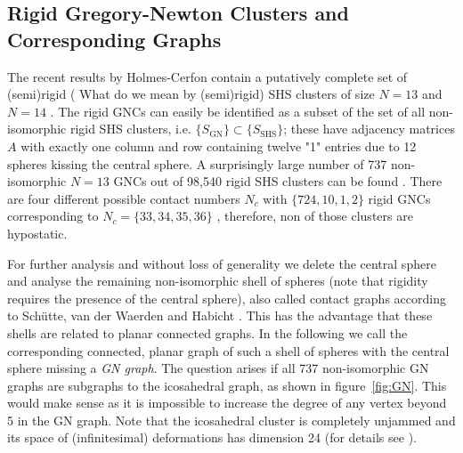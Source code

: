 \subsection{Rigid Gregory-Newton Clusters and Corresponding Graphs}

The recent results by Holmes-Cerfon contain a putatively complete set of
(semi)rigid {(\color{red} What do we mean by (semi)rigid)} SHS clusters of size $N=13$ and $N=14$
\autocite{Holmes-Cerfon_EnumeratingRigidSphere_2016}. The rigid GNCs can easily be
identified as a subset of the set of all non-isomorphic rigid SHS clusters,
i.e. $\{ S_\mathrm{GN}\}\subset \{ S_\mathrm{SHS}\}$; these have adjacency matrices
$A$ with exactly one column and row containing twelve "1" entries due to 12
spheres kissing the central sphere. A surprisingly large number of 737
non-isomorphic $N = 13$ GNCs out of 98,540 rigid SHS clusters can be found
\autocite{Trombach_stickyhardsphereLennardJonestypeclusters_2018}. There are four different possible contact numbers $N_c$
with $\{724,10,1,2\}$ rigid GNCs corresponding to $N_c=\{33,34,35,36\}$
\autocite{Robinson_Arrangement24points_1961}, therefore, non of those clusters are hypostatic.

For further analysis and without loss of generality we delete the central
sphere and analyse the remaining non-isomorphic shell of spheres (note that
rigidity requires the presence of the central sphere), also called contact
graphs according to Sch{\"u}tte, van der Waerden and Habicht
\autocite{Schuette_AufwelcherKugel_1951}. This has the advantage that these shells are related to
planar connected graphs. In the following we call the corresponding connected,
planar graph of such a shell of spheres with the central sphere missing a
\textit{GN graph}. The question arises if all 737 non-isomorphic GN graphs are
subgraphs to the icosahedral graph, as shown in figure~\ref{fig:GN}. This would
make sense as it is impossible to increase the degree of any vertex beyond 5 in
the GN graph. Note that the icosahedral cluster is completely unjammed and its
space of (infinitesimal) deformations has dimension 24 (for details see
\citeauthor{Kusner_ConfigurationSpacesEqual_2018}\autocite{Kusner_ConfigurationSpacesEqual_2018}).

